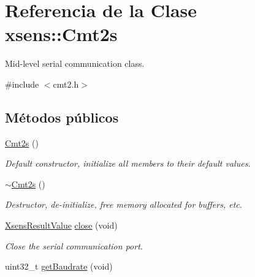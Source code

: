 \hypertarget{classxsens_1_1Cmt2s}{\section{\-Referencia de la \-Clase xsens\-:\-:\-Cmt2s}
\label{classxsens_1_1Cmt2s}
}


\-Mid-\/level serial communication class.  




{\ttfamily \#include $<$cmt2.\-h$>$}

\subsection*{\-Métodos públicos}
\begin{DoxyCompactItemize}
\item 
\hypertarget{classxsens_1_1Cmt2s_a19fd7f1bdcc307b7ef285f0f97be621b}{\hyperlink{classxsens_1_1Cmt2s_a19fd7f1bdcc307b7ef285f0f97be621b}{\-Cmt2s} ()}\label{classxsens_1_1Cmt2s_a19fd7f1bdcc307b7ef285f0f97be621b}

\begin{DoxyCompactList}\small\item\em \-Default constructor, initialize all members to their default values. \end{DoxyCompactList}\item 
\hypertarget{classxsens_1_1Cmt2s_a2a67c3108870c0ed61fde78ffce17841}{\hyperlink{classxsens_1_1Cmt2s_a2a67c3108870c0ed61fde78ffce17841}{$\sim$\-Cmt2s} ()}\label{classxsens_1_1Cmt2s_a2a67c3108870c0ed61fde78ffce17841}

\begin{DoxyCompactList}\small\item\em \-Destructor, de-\/initialize, free memory allocated for buffers, etc. \end{DoxyCompactList}\item 
\hypertarget{classxsens_1_1Cmt2s_a6c1d8935ef7ac15be3f5cd6b3801ebad}{\hyperlink{group__enums_ga822a2260a20af524029eef9e9a51ff6f}{\-Xsens\-Result\-Value} \hyperlink{classxsens_1_1Cmt2s_a6c1d8935ef7ac15be3f5cd6b3801ebad}{close} (void)}\label{classxsens_1_1Cmt2s_a6c1d8935ef7ac15be3f5cd6b3801ebad}

\begin{DoxyCompactList}\small\item\em \-Close the serial communication port. \end{DoxyCompactList}\item 
\hypertarget{classxsens_1_1Cmt2s_a940ae8df233d0e7b22698219d2b55974}{uint32\-\_\-t \hyperlink{classxsens_1_1Cmt2s_a940ae8df233d0e7b22698219d2b55974}{get\-Baudrate} (void)}\label{classxsens_1_1Cmt2s_a940ae8df233d0e7b22698219d2b55974}


\end{DoxyCompactItemize}
